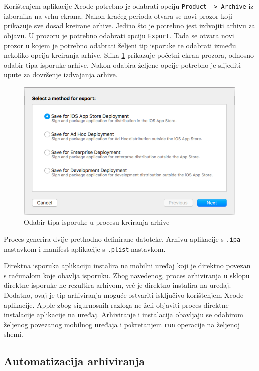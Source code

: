 \documentclass[times, utf8, diplomski, numeric]{fer}
\begin{document}
Korištenjem aplikacije Xcode potrebno je odabrati opciju \verb|Product -> Archive| iz izbornika na vrhu ekrana. Nakon kraćeg perioda otvara se novi prozor koji prikazuje sve dosad kreirane arhive. Jedino što je potrebno jest izdvojiti arhivu za objavu. U prozoru je potrebno odabrati opciju \verb|Export|. Tada se otvara novi prozor u kojem je potrebno odabrati željeni tip isporuke te odabrati između nekoliko opcija kreiranja arhive. Slika \ref{fig:XcodeArchiveOptions} prikazuje početni ekran prozora, odnosno odabir tipa isporuke arhive. Nakon odabira željene opcije potrebno je slijediti upute za dovršenje izdvajanja arhive.

\begin{figure}
\centering
\includegraphics[scale=0.6]{XcodeArchiveOptions}
\caption{Odabir tipa isporuke u procesu kreiranja arhive}
\label{fig:XcodeArchiveOptions}
\end{figure}

Proces generira dvije prethodno definirane datoteke. Arhivu aplikacije s \verb|.ipa| nastavkom i manifest aplikacije s \verb|.plist| nastavkom.

Direktna isporuka aplikaciju instalira na mobilni uređaj koji je direktno povezan s računalom koje obavlja isporuku. Zbog navedenog, proces arhiviranja u sklopu direktne isporuke ne rezultira arhivom, već je direktno instalira na uređaj. Dodatno, ovaj je tip arhiviranja moguće ostvariti isključivo korištenjem Xcode aplikacije. Apple zbog sigurnosnih razloga ne želi objaviti proces direktne instalacije aplikacije na uređaj. Arhiviranje i instalacija obavljaju se odabirom željenog povezanog mobilnog uređaja i pokretanjem \verb|run| operacije na željenoj shemi.

\subsection{Automatizacija arhiviranja}
\end{document}
